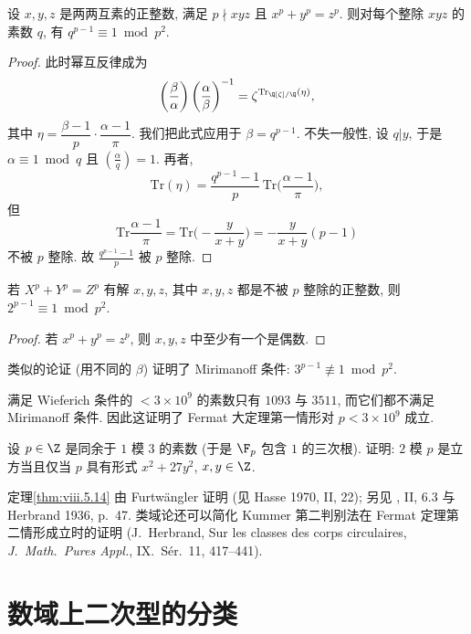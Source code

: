 \begin{theorem}\label{thm:viii.5.14}
设 $x,y,z$ 是两两互素的正整数, 满足 $p\nmid xyz$ 且 $x^{p}+y^{p}=z^{p}$. 则对每个整除 $xyz$ 的素数 $q$, 有 $q^{p-1}\equiv 1 \bmod p^{2}$.
\end{theorem}

\begin{proof}
此时幂互反律成为
\[
\left(\frac{\beta}{\alpha}\right)\left(\frac{\alpha}{\beta}\right)^{-1}=\zeta^{\mathrm{Tr}_{\Q[\zeta]/\Q}(\eta)},
\]
其中 $\eta=\dfrac{\beta-1}{p}\cdot\dfrac{\alpha-1}{\pi}$. 我们把此式应用于 $\beta=q^{p-1}$. 不失一般性, 设 $q|y$, 于是 $\alpha\equiv 1 \bmod q$ 且 $\left(\frac{\alpha}{q}\right)=1$. 再者,
\[
\mathrm{Tr}(\eta)=\frac{q^{p-1}-1}{p}\,\mathrm{Tr}\Big(\frac{\alpha-1}{\pi}\Big),
\]
但
\[
\mathrm{Tr}\frac{\alpha-1}{\pi}=\mathrm{Tr}\Big(-\frac{y}{x+y}\Big)=-\frac{y}{x+y}(p-1)
\]
不被 $p$ 整除. 故 $\frac{q^{p-1}-1}{p}$ 被 $p$ 整除.
\end{proof}

\begin{corollary}[WIEFERICH 条件]\label{cor:viii.5.15}
若 $X^{p}+Y^{p}=Z^{p}$ 有解 $x,y,z$, 其中 $x,y,z$ 都是不被 $p$ 整除的正整数, 则 $2^{p-1}\equiv 1 \bmod p^{2}$.
\end{corollary}

\begin{proof}
若 $x^{p}+y^{p}=z^{p}$, 则 $x,y,z$ 中至少有一个是偶数.
\end{proof}

类似的论证 (用不同的 $\beta$) 证明了 Mirimanoff 条件: $3^{p-1}\not\equiv 1 \bmod p^{2}$.

满足 Wieferich 条件的 $<3\times 10^{9}$ 的素数只有 $1093$ 与 $3511$, 而它们都不满足 Mirimanoff 条件. 因此这证明了 Fermat 大定理第一情形对 $p<3\times 10^{9}$ 成立.

\begin{exercise}\label{exc:viii.5.16}
设 $p\in\Z$ 是同余于 $1$ 模 $3$ 的素数 (于是 $\F_p$ 包含 $1$ 的三次根). 证明: $2$ 模 $p$ 是立方当且仅当 $p$ 具有形式 $x^{2}+27y^{2}$, $x,y\in\Z$.
\end{exercise}

\begin{NOTES}
定理\ref{thm:viii.5.14} 由 Furtw\"angler 证明 (见 Hasse 1970, II, 22); 另见 \cite{Koch1992}, II, 6.3 与 Herbrand 1936, p.~47. 类域论还可以简化 Kummer 第二判别法在 Fermat 定理第二情形成立时的证明 (J.~Herbrand, Sur les classes des corps circulaires, \emph{J.~Math.~Pures Appl.}, IX.~S\'er.~11, 417--441).
\end{NOTES}
\section{数域上二次型的分类}\label{sec:VIII.6}

